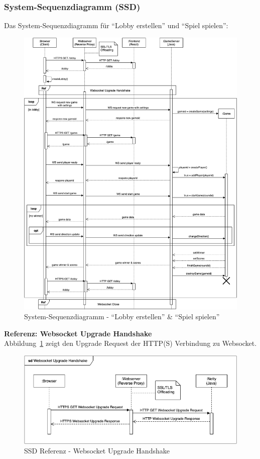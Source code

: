 \documentclass[11pt,ngerman]{article}
\newcommand{\quotes}[1]{``#1''}
\begin{document}
         \subsubsection{System-Sequenzdiagramm (SSD)}
         Das System-Sequenzdiagramm für \quotes{Lobby erstellen} und \quotes{Spiel spielen}:
         \begin{figure}[H]
             \includegraphics[scale=0.5]{figures/SystemSequenceDiagram.png}
             \caption{System-Sequenzdiagramm - \quotes{Lobby erstellen} \&  \quotes{Spiel spielen}}
         \end{figure}
         \newpage
        \noindent \textbf{Referenz: \Gls{Websocket} Upgrade Handshake} \\
        Abbildung~\ref{fig:SSDReferenzWebsocketUpgrade} zeigt den Upgrade Request der HTTP(S) Verbindung  zu \Gls{Websocket}.
        \begin{figure}[H]
            \centering
            \includegraphics[scale=0.6]{figures/SSD-Websocket_Upgrade_Handshake.png}
            \caption{SSD Referenz - \Gls{Websocket} Upgrade Handshake}
            \label{fig:SSDReferenzWebsocketUpgrade}
        \end{figure}
\end{document}
